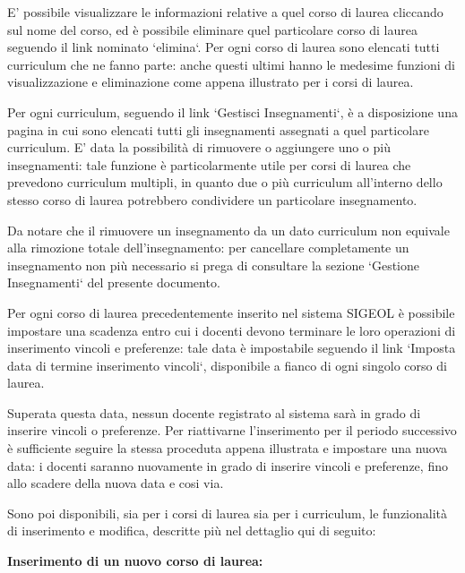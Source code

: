 \documentclass[11pt,a4paper]{article}
\begin{document}
E' possibile visualizzare le informazioni relative a quel corso di laurea cliccando sul nome del corso, ed è possibile eliminare quel particolare corso di laurea seguendo il link nominato `elimina`.
Per ogni corso di laurea sono elencati tutti curriculum che ne fanno parte: anche questi ultimi hanno le medesime funzioni di visualizzazione e eliminazione come appena illustrato per i corsi di laurea.

Per ogni curriculum, seguendo il link `Gestisci Insegnamenti`, è a disposizione una pagina in cui sono elencati tutti gli insegnamenti assegnati a quel particolare curriculum. E' data la possibilità di rimuovere o aggiungere uno o più insegnamenti: tale funzione è particolarmente utile per corsi di laurea che prevedono curriculum multipli, in quanto due o più curriculum all'interno dello stesso corso di laurea potrebbero condividere un particolare insegnamento.

Da notare che il rimuovere un insegnamento da un dato curriculum non equivale alla rimozione totale dell'insegnamento: per cancellare completamente un insegnamento non più necessario si prega di consultare la sezione `Gestione Insegnamenti` del presente documento.

\bigskip
Per ogni corso di laurea precedentemente inserito nel sistema SIGEOL è possibile impostare una scadenza entro cui i docenti devono terminare le loro operazioni di inserimento vincoli e preferenze: tale data è impostabile seguendo il link `Imposta data di termine inserimento vincoli`, disponibile a fianco di ogni singolo corso di laurea.

Superata questa data, nessun docente registrato al sistema sarà in grado di inserire vincoli o preferenze. Per riattivarne l'inserimento per il periodo successivo è sufficiente seguire la stessa proceduta appena illustrata e impostare una nuova data: i docenti saranno nuovamente in grado di inserire vincoli e preferenze, fino allo scadere della nuova data e cosi via.

Sono poi disponibili, sia per i corsi di laurea sia per i curriculum, le funzionalità di inserimento e modifica, descritte più nel dettaglio qui di seguito:
\newpage
\begin{large}\textbf{Inserimento di un nuovo corso di laurea:}\end{large}
\end{document}
